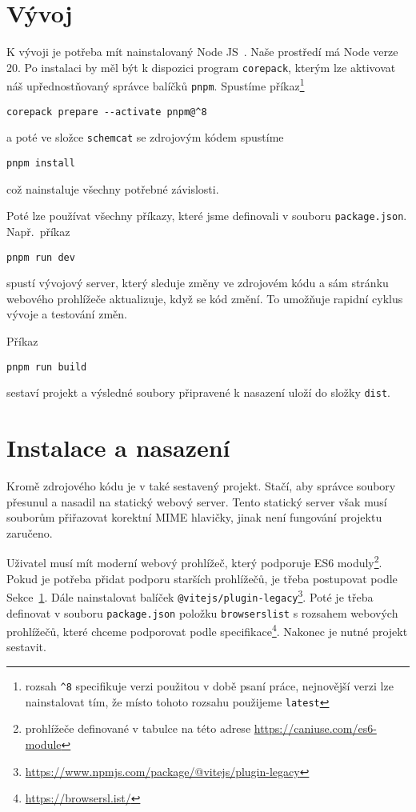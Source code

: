 \section{Vývoj}\label{section:development}

K vývoji je potřeba mít nainstalovaný Node JS~\cite{openjsfoundation_nodejs_2023}.
Naše prostředí má Node verze 20.
Po instalaci by měl být k dispozici program \texttt{corepack}, kterým lze aktivovat náš upřednostňovaný správce balíčků \texttt{pnpm}.
Spustíme příkaz\footnote{rozsah \texttt{\^{}8} specifikuje verzi použitou v době psaní práce, nejnovější verzi lze nainstalovat tím, že místo tohoto rozsahu použijeme \texttt{latest}}
\begin{verbatim}
corepack prepare --activate pnpm@^8
\end{verbatim}
a poté ve složce \texttt{schemcat} se zdrojovým kódem spustíme
\begin{verbatim}
pnpm install
\end{verbatim}
což nainstaluje všechny potřebné závislosti.

Poté lze používat všechny příkazy, které jsme definovali v souboru \texttt{package.json}.
Např.~příkaz
\begin{verbatim}
pnpm run dev
\end{verbatim}
spustí vývojový server, který sleduje změny ve zdrojovém kódu a sám stránku webového prohlížeče aktualizuje, když se kód změní.
To umožňuje rapidní cyklus vývoje a testování změn.

Příkaz
\begin{verbatim}
pnpm run build
\end{verbatim}
sestaví projekt a výsledné soubory připravené k nasazení uloží do složky \texttt{dist}.

\section{Instalace a nasazení}

Kromě zdrojového kódu je v  také sestavený projekt.
Stačí, aby správce soubory přesunul a nasadil na statický webový server.
Tento statický server však musí souborům přiřazovat korektní MIME hlavičky, jinak není fungování projektu zaručeno.

Uživatel musí mít moderní webový prohlížeč, který podporuje ES6 moduly\footnote{prohlížeče definované v tabulce na této adrese \url{https://caniuse.com/es6-module}}.
Pokud je potřeba přidat podporu starších prohlížečů, je třeba postupovat podle Sekce~\ref{section:development}.
Dále nainstalovat balíček \texttt{@vitejs/plugin-legacy}\footnote{\url{https://www.npmjs.com/package/@vitejs/plugin-legacy}}.
Poté je třeba definovat v souboru \texttt{package.json} položku \texttt{browserslist} s rozsahem webových prohlížečů, které chceme podporovat podle specifikace\footnote{\url{https://browsersl.ist/}}.
Nakonec je nutné projekt sestavit.

